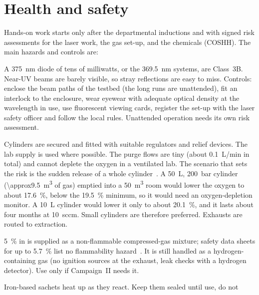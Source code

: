 \section{Health and safety}\label{sec:safety}

Hands-on work starts only after the departmental inductions and with signed risk assessments for the
laser work, the gas set-up, and the chemicals (COSHH). The main hazards and controls are:

\begin{description}[style=nextline,leftmargin=1.2em,itemsep=3pt]
  \item[Near-UV laser radiation] A \SI{375}{nm} diode of tens of milliwatts, or the \SI{369.5}{nm}
        systems, are Class~3B. Near-UV beams are barely visible, so stray reflections are easy to
        miss. Controls: enclose the beam paths of the testbed (the long runs are unattended), fit an
        interlock to the enclosure, wear eyewear with adequate optical density at the wavelength in
        use, use fluorescent viewing cards, register the set-up with the laser safety officer and follow
        the local rules. Unattended operation needs its own risk assessment.
  \item[Compressed and inert gases] Cylinders are secured and fitted with suitable regulators and
        relief devices. The lab \Ntwo{} supply is used where possible. The purge flows are tiny
        (about \SI{0.1}{L/min} in total) and cannot deplete the oxygen in a ventilated lab. The scenario
        that sets the risk is the sudden release of a whole cylinder~\cite{BCGACP52}. A \SI{50}{L},
        \SI{200}{bar} \Ntwo{} cylinder (\SI{\approx9.5}{m^3} of gas) emptied into a \SI{50}{m^3} room would
        lower the oxygen to about \SI{17.6}{\percent}, below the \SI{19.5}{\percent} minimum, so it would
        need an oxygen-depletion monitor. A \SI{10}{L} cylinder would lower it only to about
        \SI{20.1}{\percent}, and it lasts about four months at \SI{10}{sccm}. Small cylinders are therefore
        preferred. Exhausts are routed to extraction.
  \item[Forming gas] \SI{5}{\percent} \Htwo{} in \Ntwo{} is supplied as a non-flammable compressed-gas
        mixture; safety data sheets for up to \SI{5.7}{\percent} \Htwo{} list no flammability
        hazard~\cite{AirLiquideSDS}. It is still handled as a hydrogen-containing gas (no ignition sources
        at the exhaust, leak checks with a hydrogen detector). Use only if Campaign~II needs it.
  \item[Oxygen absorbers] Iron-based sachets heat up as they react. Keep them sealed until use, do not

\end{description}
